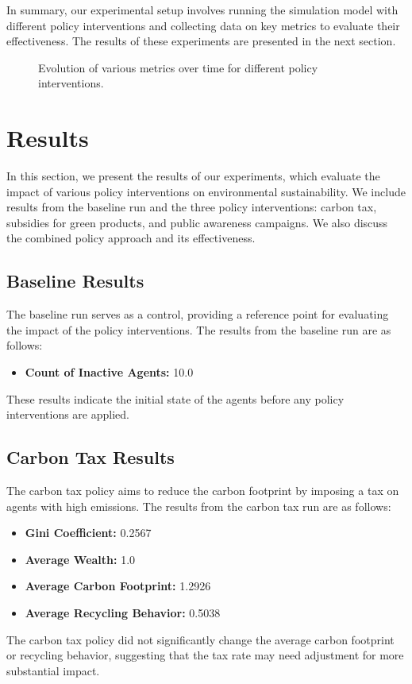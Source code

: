 \documentclass{article} %
\begin{document}
In summary, our experimental setup involves running the simulation model with different policy interventions and collecting data on key metrics to evaluate their effectiveness. The results of these experiments are presented in the next section.

\begin{figure}[t]
    \centering
    \caption{Evolution of various metrics over time for different policy interventions.}
    \label{fig:results}
\end{figure}

\section{Results}
\label{sec:results}
In this section, we present the results of our experiments, which evaluate the impact of various policy interventions on environmental sustainability. We include results from the baseline run and the three policy interventions: carbon tax, subsidies for green products, and public awareness campaigns. We also discuss the combined policy approach and its effectiveness.

\subsection{Baseline Results}
The baseline run serves as a control, providing a reference point for evaluating the impact of the policy interventions. The results from the baseline run are as follows:
\begin{itemize}
    \item \textbf{Count of Inactive Agents:} 10.0
\end{itemize}
These results indicate the initial state of the agents before any policy interventions are applied.

\subsection{Carbon Tax Results}
The carbon tax policy aims to reduce the carbon footprint by imposing a tax on agents with high emissions. The results from the carbon tax run are as follows:
\begin{itemize}
    \item \textbf{Gini Coefficient:} 0.2567
    \item \textbf{Average Wealth:} 1.0
    \item \textbf{Average Carbon Footprint:} 1.2926
    \item \textbf{Average Recycling Behavior:} 0.5038
\end{itemize}
The carbon tax policy did not significantly change the average carbon footprint or recycling behavior, suggesting that the tax rate may need adjustment for more substantial impact.
\end{document}
